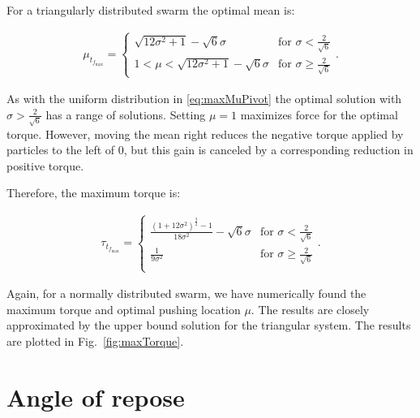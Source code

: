 For a triangularly distributed swarm the optimal mean is:

\begin{align}
\mu_{t_{f_\max}}= \left\{
\begin{array}{ll}
 \sqrt{12\sigma^2 +1}  -\sqrt{6}\sigma &   \textrm{for     }  \sigma  <\frac{2}{\sqrt{6}} \\
1<\mu<  \sqrt{12\sigma^2 +1}  -\sqrt{6}\sigma&   \textrm{for     } \sigma \geq \frac{2}{\sqrt{6}} 
\end{array} 
\right. .
\end{align}

As with the uniform distribution in \eqref{eq:maxMuPivot} the optimal solution with $\sigma > \frac{2}{\sqrt{6}}$ has a range of solutions. Setting $\mu=1$ maximizes force for the optimal torque. However, moving the mean right reduces the negative torque applied by particles to the left of 0, but this gain is canceled by a corresponding reduction in positive torque.

Therefore, the maximum torque is:

\begin{align}\label{eq:triFreeMaxTorque}
\tau_{t_{f_\max}} =\left\{
\begin{array}{ll}
\frac{ (1+12\sigma^2)^{\frac{3}{2}}-1}{18\sigma^2} - \sqrt{6}\sigma &   \textrm{for     } \sigma < \frac{2}{\sqrt{6}}\\
\frac{1}{9\sigma^2} &   \textrm{for     } \sigma \geq \frac{2}{\sqrt{6}}\\
\end{array} 
\right. .
\end{align}

Again, for a normally distributed swarm, we have numerically found the maximum torque and optimal pushing location $\mu$. The results are closely approximated by the upper bound solution for the triangular system. 
 The results are plotted in Fig.~\ref{fig:maxTorque}.


\section{Angle of repose}\label{sec:angle}




